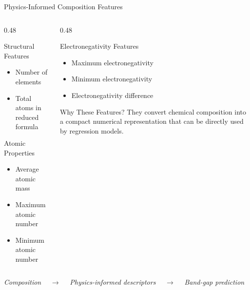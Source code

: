 \documentclass[aspectratio=169,11pt]{beamer}
\begin{document}
\begin{frame}{Physics-Informed Composition Features}
	
	\begin{columns}[c]
		
		\begin{column}{0.48\textwidth}
			
			\begin{block}{Structural Features}
				\begin{itemize}
					\item Number of elements
					\item Total atoms in reduced formula
				\end{itemize}
			\end{block}
			
			\vspace{0.15cm}
			
			\begin{block}{Atomic Properties}
				\begin{itemize}
					\item Average atomic mass
					\item Maximum atomic number
					\item Minimum atomic number
				\end{itemize}
			\end{block}
			
		\end{column}
		
		\begin{column}{0.48\textwidth}
			
			\begin{block}{Electronegativity Features}
				\begin{itemize}
					\item Maximum electronegativity
					\item Minimum electronegativity
					\item Electronegativity difference
				\end{itemize}
			\end{block}
			
			\vspace{0.25cm}
			
			\begin{alertblock}{Why These Features?}
				They convert chemical composition into a
				compact numerical representation that can
				be directly used by regression models.
			\end{alertblock}
			
		\end{column}
		
	\end{columns}
	
	\vspace{0.25cm}
	
	\begin{center}
		\small
		\textit{Composition}
		$\quad\longrightarrow\quad$
		\textit{Physics-informed descriptors}
		$\quad\longrightarrow\quad$
		\textit{Band-gap prediction}
	\end{center}
	
\end{frame}
\end{document}
